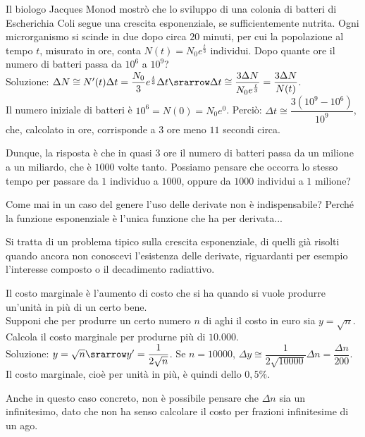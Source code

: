 \begin{esempio}
 Il biologo Jacques Monod mostrò che lo sviluppo di una colonia di batteri 
 di Escherichia Coli segue una crescita esponenziale, se sufficientemente 
 nutrita. Ogni microrganismo si scinde in due dopo circa $20$ minuti, per cui 
 la popolazione al tempo $t$, misurato in ore, conta $N(t)=N_0e^{\frac{t}{3}}$
 individui. Dopo quante ore il numero di batteri passa da $10^6$ a $10^9$?\\
 Soluzione: $\Delta N\cong N'(t)\Delta t=\dfrac{N_0}{3}e^{\frac{t}{3}}\Delta t
 \srarrow \Delta t\cong\dfrac{3\Delta N}{N_0e^{\frac{t}{3}}}=\dfrac{3\Delta N}
 {N(t)}$.\\
 Il numero iniziale di batteri è $10^6=N(0)=N_0e^0$. Perciò:
 $\Delta t\cong\dfrac{3(10^9-10^6)}{10^9}$, che, calcolato in ore,  corrisponde 
a 
 3 ore meno $11$ secondi circa.
 
 \begin{osservazione}
  Dunque, la risposta è che in quasi $3$ ore il numero di batteri passa da un 
  milione a un miliardo, che è $1000$ volte tanto. Possiamo pensare che 
  occorra lo stesso tempo per passare da $1$ individuo a $1000$, oppure da 
  $1000$ individui a $1$ milione?
 \end{osservazione}
 \begin{osservazione}
 Come mai in un caso del genere l'uso delle derivate non è indispensabile? 
 Perché la funzione esponenziale è l'unica funzione che ha per derivata...
\end{osservazione}
\begin{osservazione}
  Si tratta di un problema tipico sulla crescita esponenziale, di quelli già 
  risolti quando ancora non conoscevi l'esistenza delle derivate, riguardanti
  per esempio l'interesse composto o il decadimento radiattivo.
 \end{osservazione}

\end{esempio}
 
\begin{esempio}
Il costo marginale è l'aumento di costo che si ha quando si vuole produrre 
un'unità in più di un certo bene.\\
Supponi che per produrre un certo numero $n$ di aghi il costo in euro sia
$y=\sqrt{n}$. Calcola il costo marginale per produrne più di $10.000$.\\
Soluzione: $y=\sqrt{n}\srarrow y'=\dfrac{1}{2\sqrt{n}}$.
Se $n=10000$, $\Delta y \cong\dfrac{1}{2\sqrt{10000}}\Delta n=\dfrac{\Delta 
n}{200}$.
Il costo marginale, cioè per unità in più, è quindi dello $0,5\%$.
\begin{osservazione}
 Anche in questo caso concreto, non è possibile pensare che $\Delta n$ sia 
 un infinitesimo, dato che non ha senso calcolare il costo per frazioni 
 infinitesime di un ago.
\end{osservazione}
\end{esempio}
 
